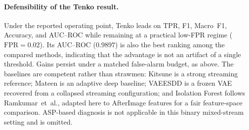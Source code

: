 \paragraph{Defensibility of the Tenko result.}
Under the reported operating point, Tenko leads on TPR, F1, Macro~F1, Accuracy, and
AUC--ROC while remaining at a practical low-FPR regime ($\mathrm{FPR}{=}0.02$).
Its AUC--ROC ($0.9897$) is also the best ranking among the compared methods,
indicating that the advantage is not an artifact of a single threshold.
Gains persist under a matched false-alarm budget, as above.
The baselines are competent rather than strawmen: Kitsune is a strong streaming
reference; Mateen is an adaptive deep baseline; VAEESDD is a frozen VAE recovered
from a collapsed streaming configuration; and Isolation Forest follows
Ramkumar~et~al., adapted here to AfterImage features for a fair feature-space
comparison.
ASP-based diagnosis is not applicable in this binary mixed-stream setting and is
omitted.
